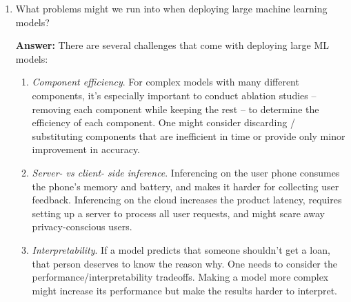 \documentclass{article}
\newenvironment{QandA}{\begin{enumerate}[label=\arabic*.]}{\end{enumerate}}
\newenvironment{ListAlph}{\begin{enumerate}[label=(\alph*)]}{\end{enumerate}}
\newenvironment{answer}{\par\normalfont \textbf{Answer:}}{}
\newcommand{\g}{\vert}
\begin{document}
\begin{QandA}
\begin{answer}
\begin{ListAlph}
            \item Caused by the test data. Given a distribution $P(X, Y)$, where $X$ are the inputs, and $Y$ are the targets, a model deployed in production can experience the following shifts in data:
            \begin{itemize}
                \item Covariate shift: $P(X)$ changes, but $P(Y \g X)$ remains the same.
                \item Label shift: $P(Y)$ changes, but $P(X \g Y)$ remains the same.
                \item Concept drift: $P(Y \g X) $ changes, but $P(X)$ remains the same.
            \end{itemize}
        \end{ListAlph}
        (See more \href{https://huyenchip.com/2022/02/07/data-distribution-shifts-and-monitoring.html}{here})
    \end{answer}
    
    \item What problems might we run into when deploying large machine learning models?
    \begin{answer}
        There are several challenges that come with deploying large ML models:
        \begin{ListAlph}
            \item \textit{Component efficiency}. For complex models with many different components, it's especially important to conduct ablation studies -- removing each component while keeping the rest -- to determine the efficiency of each component. One might consider discarding / substituting components that are inefficient in time or provide only minor improvement in accuracy.

            \item \textit{Server- vs client- side inference}. Inferencing on the user phone consumes the phone's memory and battery, and makes it harder for collecting user feedback. Inferencing on the cloud increases the product latency, requires setting up a server to process all user requests, and might scare away privacy-conscious users.

            \item \textit{Interpretability}. If a model predicts that someone shouldn't get a loan, that person deserves to know the reason why. One needs to consider the performance/interpretability tradeoffs. Making a model more complex might increase its performance but make the results harder to interpret. 


\end{ListAlph}
\end{answer}
\end{QandA}
\end{document}
